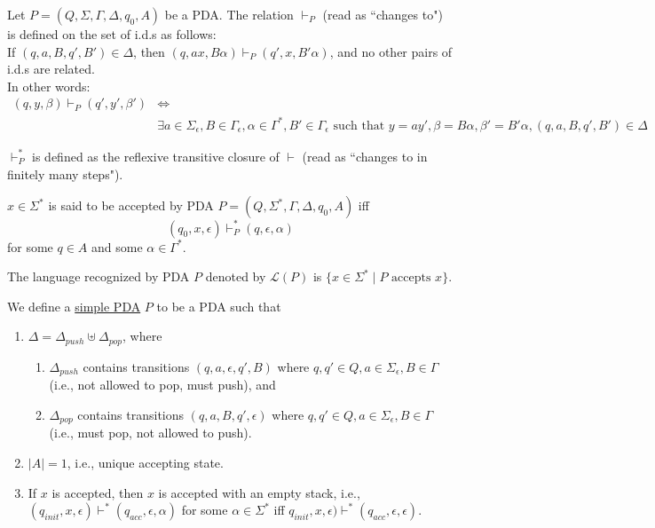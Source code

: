 \documentclass[a4paper]{article}
\newcommand{\nl}{\vspace{0.2cm}\\}
\newcommand{\mc}{\mathcal}
\renewcommand{\L}{\mc{L}}
\newcommand{\changesto}{\vdash}
\begin{document}
\begin{defn}
    Let $P = (Q, \Sigma, \Gamma, \Delta, q_0, A)$ be a PDA. The relation $\changesto_P$ (read as ``changes to") is defined on the set of i.d.s as follows:\nl
    If $(q, a, B, q', B') \in \Delta$, then $(q, ax, B\alpha) \changesto_P (q', x, B'\alpha)$, and no other pairs of i.d.s are related.\nl
    In other words:
    \begin{align*}
        (q, y, \beta) \changesto_P (q', y', \beta') &\iff\\ &\exists a \in \Sigma_\epsilon, B \in \Gamma_\epsilon, \alpha \in \Gamma^*, B' \in \Gamma_\epsilon \text{ such that } y = ay', \beta =
    B\alpha, \beta' = B'\alpha, (q, a, B, q', B') \in \Delta
    \end{align*}
\end{defn}

\begin{defn}
    $\changesto^*_P$ is defined as the reflexive transitive closure of $\changesto$ (read as ``changes to in finitely many steps").
\end{defn}

\begin{defn}
    $x \in \Sigma^*$ is said to be accepted by PDA $P = (Q, \Sigma^*, \Gamma, \Delta, q_0, A)$ iff
    $$(q_0, x, \epsilon) \changesto^*_P (q, \epsilon, \alpha)$$
    for some $q \in A$ and some $\alpha \in \Gamma^*$.
\end{defn}

\begin{defn}
    The language recognized by PDA $P$ denoted by $\L(P)$ is $\{x \in \Sigma^* \mid P \text{ accepts }x\}$.
\end{defn}

\begin{defn}
We define a \underline{simple PDA} $P$ to be a PDA such that
\begin{enumerate}
    \item $\Delta = \Delta_{push} \uplus \Delta_{pop}$, where
        \begin{enumerate}
            \item $\Delta_{push}$ contains transitions $(q, a, \epsilon, q', B)$ where $q, q' \in Q, a \in \Sigma_\epsilon, B \in \Gamma$ (i.e., not allowed to pop, must push), and
            \item $\Delta_{pop}$ contains transitions $(q, a, B, q', \epsilon)$ where $q, q' \in Q, a \in \Sigma_\epsilon, B \in \Gamma$ (i.e., must pop, not allowed to push).
        \end{enumerate}
        \item $|A| = 1$, i.e., unique accepting state.
        \item If $x$ is accepted, then $x$ is accepted with an empty stack, i.e., $(q_{init}, x, \epsilon) \changesto^* (q_{acc}, \epsilon, \alpha)$ for some $\alpha \in \Sigma^*$ iff $q_{init},
            x, \epsilon) \changesto^* (q_{acc}, \epsilon, \epsilon)$.
\end{enumerate}
\end{defn}
\end{document}
